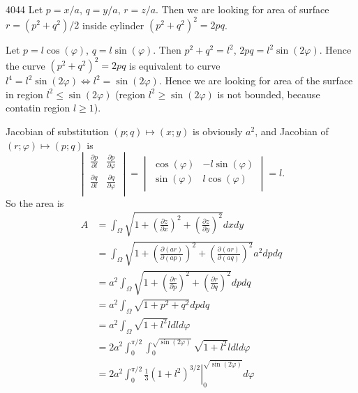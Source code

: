 \documentclass[12pt,a4paper]{article}
\begin{document}
    \begin{problem}{4044}
        Let $p = x/a$, $q=y/a$, $r=z/a$. Then we are looking for area of surface $r = (p^2 + q^2)/2$ inside cylinder $(p^2 + q^2)^2 = 2 pq$.
        
        Let $p = l \cos(\varphi)$, $q = l \sin(\varphi)$. Then $p^2 + q^2 = l^2$, $2pq = l^2 \sin(2\varphi)$. Hence the curve $(p^2 + q^2)^2 = 2 pq$ is equivalent to curve $l^4 = l^2 \sin(2\varphi) \Leftrightarrow l^2 = \sin(2\varphi)$. Hence we are looking for area of the surface in region $l^2 \leqslant \sin(2\varphi)$ (region $l^2 \geqslant \sin(2\varphi)$ is not bounded, because contatin region $l\geqslant 1$).

        Jacobian of substitution $(p; q) \mapsto (x; y)$ is obviously $a^2$, and Jacobian of $(r; \varphi) \mapsto (p; q)$ is
        \[
            \begin{vmatrix}
                \frac{\partial p}{\partial l}& \frac{\partial p}{\partial \varphi}\\
                \frac{\partial q}{\partial l}& \frac{\partial q}{\partial \varphi}\\
            \end{vmatrix}
            =
            \begin{vmatrix}
                \cos(\varphi)& -l\sin(\varphi)\\
                \sin(\varphi)& l\cos(\varphi)\\
            \end{vmatrix}
            = l.
        \]
        So the area is
        \begin{align*}
            A
            &= \int_\Omega \sqrt{1 + \left(\frac{\partial z}{\partial x}\right)^2 + \left(\frac{\partial z}{\partial y}\right)^2} dx dy\\
            &= \int_\Omega \sqrt{1 + \left(\frac{\partial (ar)}{\partial (ap)}\right)^2 + \left(\frac{\partial (ar)}{\partial (aq)}\right)^2} a^2 dp dq\\
            &= a^2 \int_\Omega \sqrt{1 + \left(\frac{\partial r}{\partial p}\right)^2 + \left(\frac{\partial r}{\partial q}\right)^2} dp dq\\
            &= a^2 \int_\Omega \sqrt{1 + p^2 + q^2} dp dq\\
            &= a^2 \int_\Omega \sqrt{1 + l^2} l dl d\varphi\\
            &= 2a^2 \int_0^{\pi/2} \int_0^{\sqrt{\sin(2\varphi)}} \sqrt{1 + l^2} l dl d\varphi\\
            &= 2a^2 \int_0^{\pi/2} \left. \frac{1}{3} (1 + l^2)^{3/2} \right|_0^{\sqrt{\sin(2\varphi)}} d\varphi\\

\end{align*}
\end{problem}
\end{document}
